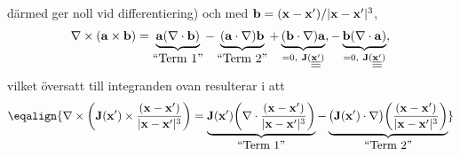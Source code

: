 {{{d{\"a}rmed ger noll vid differentiering) och med
${\bf b}=({\bf x}-{\bf x}')/|{\bf x}-{\bf x}'|^3$,
$$
  \nabla\times({\bf a}\times{\bf b})
    =\underbrace{{\bf a}(\nabla\cdot{\bf b})}_{\hbox{``Term 1''}}
      -\underbrace{({\bf a}\cdot\nabla){\bf b}}_{\hbox{``Term 2''}}
      +\underbrace{({\bf b}\cdot\nabla){\bf a}}_{
         =0,\ {\bf J}(\underline{\underline{\underline{{\bf x}'}}})},
      -\underbrace{{\bf b}(\nabla\cdot{\bf a})}_{
         =0,\ {\bf J}(\underline{\underline{\underline{{\bf x}'}}})},
$$
vilket {\"o}versatt till integranden ovan resulterar i att
$$
  \eqalign{
    \nabla\times
        \bigg(
        {\bf J}({\bf x}')\times
          {{({\bf x}-{\bf x}')}\over{|{\bf x}-{\bf x}'|^3}}
        \bigg)
        =\underbrace{
        {\bf J}({\bf x}')
        \bigg(
        \nabla\cdot
          {{({\bf x}-{\bf x}')}\over{|{\bf x}-{\bf x}'|^3}}
        \bigg)
        }_{\hbox{``Term 1''}}
        -\underbrace{
        \big({\bf J}({\bf x}')\cdot\nabla\big)
        \bigg(
          {{({\bf x}-{\bf x}')}\over{|{\bf x}-{\bf x}'|^3}}
        \bigg)
        }_{\hbox{``Term 2''}}
  }
$$
\vfill\eject

}}}
